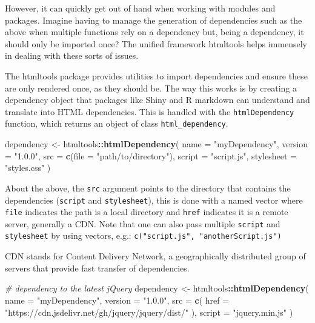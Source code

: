 \documentclass[10pt,]{krantz}
\makeatletter
\newenvironment{Shaded}{\begin{snugshade}}{\end{snugshade}}
\newcommand{\CommentTok}[1]{\textcolor[rgb]{0.37,0.37,0.37}{\textit{#1}}}
\newcommand{\DataTypeTok}[1]{\textcolor[rgb]{0.27,0.27,0.27}{#1}}
\newcommand{\KeywordTok}[1]{\textcolor[rgb]{0.27,0.27,0.27}{\textbf{#1}}}
\newcommand{\NormalTok}[1]{#1}
\newcommand{\OperatorTok}[1]{\textcolor[rgb]{0.43,0.43,0.43}{\textbf{#1}}}
\newcommand{\StringTok}[1]{\textcolor[rgb]{0.5,0.5,0.5}{#1}}
\newenvironment{kframe}{%
\medskip{}
\setlength{\fboxsep}{.8em}
 \def\at@end@of@kframe{}%
 \ifinner\ifhmode%
  \def\at@end@of@kframe{\end{minipage}}%
  \begin{minipage}{\columnwidth}%
 \fi\fi%
 \def\FrameCommand##1{\hskip\@totalleftmargin \hskip-\fboxsep
 \colorbox{shadecolor}{##1}\hskip-\fboxsep
     \hskip-\linewidth \hskip-\@totalleftmargin \hskip\columnwidth}%
 \MakeFramed {\advance\hsize-\width
   \@totalleftmargin\z@ \linewidth\hsize
   \@setminipage}}%
 {\par\unskip\endMakeFramed%
 \at@end@of@kframe}
\renewenvironment{Shaded}{\begin{kframe}}{\end{kframe}}
\newenvironment{rmdblock}[1]
  {
  \begin{itemize}
  \renewcommand{\labelitemi}{
    \raisebox{-.7\height}[0pt][0pt]{
      {\setkeys{Gin}{width=3em,keepaspectratio}\texttt{[image: images/\#1]}}
    }
  }
  \setlength{\fboxsep}{1em}
  \begin{kframe}
  \item
  }
  {
  \end{kframe}
  \end{itemize}
  }
\newenvironment{rmdnote}
  {\begin{rmdblock}{note}}
  {\end{rmdblock}}
\makeatother
\begin{document}
However, it can quickly get out of hand when working with modules and packages. Imagine having to manage the generation of dependencies such as the above when multiple functions rely on a dependency but, being a dependency, it should only be imported once? The unified framework htmltools helps immensely in dealing with these sorts of issues.

The htmltools package provides utilities to import dependencies and ensure these are only rendered once, as they should be. The way this works is by creating a dependency object that packages like Shiny and R markdown can understand and translate into HTML dependencies. This is handled with the \texttt{htmlDependency} function, which returns an object of class \texttt{html\_dependency}.

\begin{Shaded}
\begin{Highlighting}[]
\NormalTok{dependency <-}\StringTok{ }\NormalTok{htmltools}\OperatorTok{::}\KeywordTok{htmlDependency}\NormalTok{(}
  \DataTypeTok{name =} \StringTok{"myDependency"}\NormalTok{,}
  \DataTypeTok{version =} \StringTok{"1.0.0"}\NormalTok{,}
  \DataTypeTok{src =} \KeywordTok{c}\NormalTok{(}\DataTypeTok{file =} \StringTok{"path/to/directory"}\NormalTok{),}
  \DataTypeTok{script =} \StringTok{"script.js"}\NormalTok{,}
  \DataTypeTok{stylesheet =} \StringTok{"styles.css"}
\NormalTok{)}
\end{Highlighting}
\end{Shaded}

About the above, the \texttt{src} argument points to the directory that contains the dependencies (\texttt{script} and \texttt{stylesheet}), this is done with a named vector where \texttt{file} indicates the path is a local directory and \texttt{href} indicates it is a remote server, generally a CDN. Note that one can also pass multiple \texttt{script} and \texttt{stylesheet} by using vectors, e.g.: \texttt{c("script.js",\ "anotherScript.js")}

\begin{rmdnote}
CDN stands for Content Delivery Network, a geographically distributed
group of servers that provide fast transfer of dependencies.
\end{rmdnote}

\begin{Shaded}
\begin{Highlighting}[]
\CommentTok{# dependency to the latest jQuery}
\NormalTok{dependency <-}\StringTok{ }\NormalTok{htmltools}\OperatorTok{::}\KeywordTok{htmlDependency}\NormalTok{(}
  \DataTypeTok{name =} \StringTok{"myDependency"}\NormalTok{,}
  \DataTypeTok{version =} \StringTok{"1.0.0"}\NormalTok{,}
  \DataTypeTok{src =} \KeywordTok{c}\NormalTok{(}
    \DataTypeTok{href =} \StringTok{"https://cdn.jsdelivr.net/gh/jquery/jquery/dist/"}
\NormalTok{  ),}
  \DataTypeTok{script =} \StringTok{"jquery.min.js"}
\NormalTok{)}
\end{Highlighting}
\end{Shaded}
\end{document}
